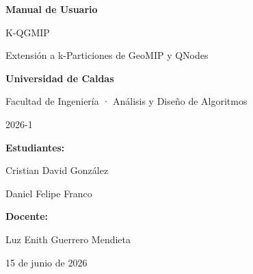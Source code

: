 \documentclass[12pt,letterpaper]{article}
\begin{document}
\begin{titlepage}
  \centering
  \vspace*{2cm}
  
  {\Huge\bfseries Manual de Usuario \par}
  \vspace{0.6cm}
  {\LARGE K-QGMIP \par}
  \vspace{0.3cm}
  {\large Extensión a k-Particiones de GeoMIP y QNodes \par}
  
  \vspace{3cm}
  
  {\Large\bfseries Universidad de Caldas \par}
  \vspace{0.4cm}
  {\large Facultad de Ingeniería · Análisis y Diseño de Algoritmos \par}
  {\large 2026-1 \par}
  
  \vspace{4cm}

  {\large\textbf{Estudiantes:} \par}
  \vspace{0.3em}
  {\large Cristian David González \par}
  {\large Daniel Felipe Franco \par}
  \vspace{1.2em}
  {\large\textbf{Docente:} \par}
  \vspace{0.3em}
  {\large Luz Enith Guerrero Mendieta \par}

  \vfill

  {\large 15 de junio de 2026 \par}
\end{titlepage}

\tableofcontents
\newpage










\end{document}
